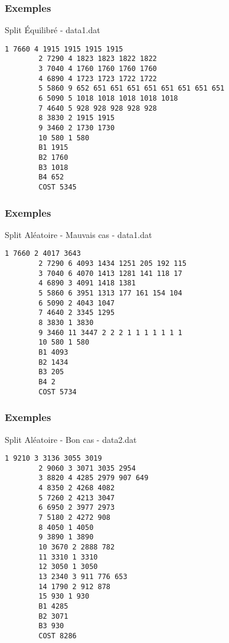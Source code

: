 \documentclass{beamer}
\begin{document}
\begin{frame}[fragile]
    \frametitle{Exemples}
    \begin{exampleblock}{Split Équilibré - data1.dat}
        \begin{lstlisting}[basicstyle=\small]
        1 7660 4 1915 1915 1915 1915 
        2 7290 4 1823 1823 1822 1822 
        3 7040 4 1760 1760 1760 1760 
        4 6890 4 1723 1723 1722 1722 
        5 5860 9 652 651 651 651 651 651 651 651 651 
        6 5090 5 1018 1018 1018 1018 1018 
        7 4640 5 928 928 928 928 928 
        8 3830 2 1915 1915 
        9 3460 2 1730 1730 
        10 580 1 580 
        B1 1915
        B2 1760
        B3 1018
        B4 652
        COST 5345
        \end{lstlisting}
    \end{exampleblock}
\end{frame}

\begin{frame}[fragile]
    \frametitle{Exemples}
    \begin{exampleblock}{Split Aléatoire - Mauvais cas - data1.dat}
        \begin{lstlisting}[basicstyle=\small]
        1 7660 2 4017 3643 
        2 7290 6 4093 1434 1251 205 192 115 
        3 7040 6 4070 1413 1281 141 118 17 
        4 6890 3 4091 1418 1381 
        5 5860 6 3951 1313 177 161 154 104 
        6 5090 2 4043 1047 
        7 4640 2 3345 1295 
        8 3830 1 3830 
        9 3460 11 3447 2 2 2 1 1 1 1 1 1 1 
        10 580 1 580 
        B1 4093
        B2 1434
        B3 205
        B4 2
        COST 5734
        \end{lstlisting}
    \end{exampleblock}
\end{frame}

\begin{frame}[fragile]
    \frametitle{Exemples}
    \begin{exampleblock}{Split Aléatoire - Bon cas - data2.dat}
        \begin{lstlisting}[basicstyle=\tiny]
        1 9210 3 3136 3055 3019 
        2 9060 3 3071 3035 2954 
        3 8820 4 4285 2979 907 649 
        4 8350 2 4268 4082 
        5 7260 2 4213 3047 
        6 6950 2 3977 2973 
        7 5180 2 4272 908 
        8 4050 1 4050 
        9 3890 1 3890 
        10 3670 2 2888 782 
        11 3310 1 3310 
        12 3050 1 3050 
        13 2340 3 911 776 653 
        14 1790 2 912 878 
        15 930 1 930 
        B1 4285
        B2 3071
        B3 930
        COST 8286
        \end{lstlisting}
    \end{exampleblock}
\end{frame}
\end{document}
